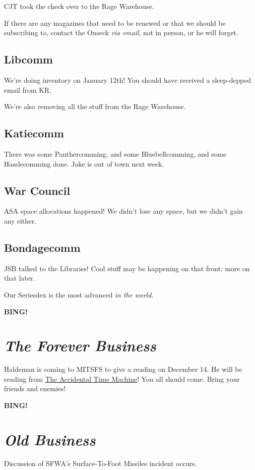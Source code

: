 \documentclass[10pt]{article}
\newcommand{\bing}{{\bf BING!} }
\newcommand{\goto}[1]{\bing \vskip 12pt \section*{{\em{#1}}}}
\begin{document}
CJT took the check over to the Rage Warehouse.

If there are any magazines that need to be renewed or that we should be subscribing to, contact the Onseck \emph{via email}, not in person, or he will forget.

\subsection*{Libcomm}

We're doing inventory on January 12th!  You should have received a sleep-depped email from KR.

We're also removing all the stuff from the Rage Warehouse.


\subsection*{Katiecomm}

There was some Panthercomming, and some Bluebellcomming, and some Hasslecomming done.  Jake is out of town next week.

\subsection*{War Council}

ASA space allocations happened!  We didn't lose any space, but we didn't gain any either.

\subsection*{Bondagecomm}

JSB talked to the Libraries!  Cool stuff may be happening on that front; more on that later.

Our Seriesdex is the most advanced \emph{in the world}.

\goto{The Forever Business}

Haldeman is coming to MITSFS to give a reading on December 14. He will be reading from \underline{The Accidental Time Machine}! You all should come.  Bring your friends and enemies!

\goto{Old Business}

Discussion of SFWA's Surface-To-Foot Missiles incident occurs.
\end{document}
